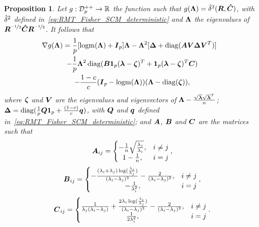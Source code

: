 \documentclass{article}
\theoremstyle{plain}
\newtheorem{proposition}[theorem]{Proposition}
\theoremstyle{definition}
\theoremstyle{remark}
\begin{document}
\begin{proposition}
\label{prop:RMT_Fisher_SCM_deterministic_grad}
    Let $g:\mathcal{D}^{++}_{p}\to\mathbb{R}$ the function such that $g(\boldsymbol{\Lambda})=\hat{\delta}^2(\boldsymbol{R},\boldsymbol{\hat{C}})$, with $\hat{\delta}^2$ defined in~\eqref{eq:RMT_Fisher_SCM_deterministic} and $\boldsymbol{\Lambda}$ the eigenvalues of $\boldsymbol{R}^{\nicefrac{-1}{2}}\boldsymbol{\hat{C}}\boldsymbol{R}^{\nicefrac{-1}{2}}$.
    It follows that
    \begin{multline*}
        \hspace*{-8pt}
        \nabla g(\boldsymbol{\Lambda}) = \frac1{p}[\operatorname{logm}(\boldsymbol{\Lambda})+\boldsymbol{I}_{p}]\boldsymbol{\Lambda}
        - \boldsymbol{\Lambda}^2[\boldsymbol{\Delta} + \operatorname{diag}(\boldsymbol{A}\boldsymbol{V}\boldsymbol{\Delta}\boldsymbol{V}^T)]
        \\
        - \frac1{p}\boldsymbol{\Lambda}^2\operatorname{diag}(\boldsymbol{B}\boldsymbol{1}_{p}(\boldsymbol{\lambda}-\boldsymbol{\zeta})^T + \boldsymbol{1}_{p}(\boldsymbol{\lambda}-\boldsymbol{\zeta})^T\boldsymbol{C})
        \\
        -\frac{1-c}{c}(\boldsymbol{I}_{p}-\operatorname{logm}(\boldsymbol{\Lambda}))(\boldsymbol{\Lambda}-\operatorname{diag}(\boldsymbol{\zeta})),
    \end{multline*}
    where $\boldsymbol{\zeta}$ and $\boldsymbol{V}$ are the eigenvalues and eigenvectors of $\boldsymbol{\Lambda}-\frac{\sqrt{\boldsymbol{\lambda}}\sqrt{\boldsymbol{\lambda}}^T}{n}$; $\boldsymbol{\Delta}=\operatorname{diag}(\frac1{p}\boldsymbol{Q}\boldsymbol{1}_{p}+\frac{(1-c)}{c}\boldsymbol{q})$, with $\boldsymbol{Q}$ and $\boldsymbol{q}$ defined in~\eqref{eq:RMT_Fisher_SCM_deterministic}; and $\boldsymbol{A}$, $\boldsymbol{B}$ and $\boldsymbol{C}$ are the matrices such that
    \begin{equation*}
        \boldsymbol{A}_{ij} = \left\{ 
        \begin{matrix}
            -\frac1{n}\sqrt{\frac{\lambda_j}{\lambda_i}}, & i\neq j
            \\
            1-\frac1{n}, & i=j
        \end{matrix}
        \right.,
    \end{equation*}
    \begin{equation*}
        \boldsymbol{B}_{ij} = \left\{ 
        \begin{matrix}
            -\frac{(\lambda_i+\lambda_j)\log(\frac{\lambda_i}{\lambda_j})}{(\lambda_i-\lambda_j)^3} - \frac{2}{(\lambda_i-\lambda_j)^2}, & i\neq j
            \\
            -\frac1{\lambda_i^2}, & i=j
        \end{matrix}
        \right.,
    \end{equation*}
    \begin{equation*}
        \boldsymbol{C}_{ij} = \left\{ 
        \begin{matrix}
            \frac{1}{\lambda_j(\lambda_i-\lambda_j)} + \frac{2\lambda_i\log(\frac{\lambda_i}{\lambda_j})}{(\lambda_i-\lambda_j)^3} - \frac{2}{(\lambda_i-\lambda_j)^2}, & i\neq j
            \\
            \frac1{2\lambda_i^2}, & i=j
        \end{matrix}
        \right..
    \end{equation*}
\end{proposition}
\end{document}
